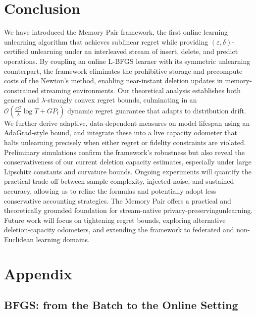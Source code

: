 \documentclass{article}
\theoremstyle{ssltheorem}
\begin{document}
\section{Conclusion}

We have introduced the Memory Pair framework, the first online learning–unlearning algorithm that achieves sublinear regret while providing $(\varepsilon, \delta)$-certified unlearning under an interleaved stream of insert, delete, and predict operations.
By coupling an online L-BFGS learner with its symmetric unlearning counterpart, the framework eliminates the prohibitive storage and precompute costs of the Newton's method, enabling near-instant deletion updates in memory-constrained streaming environments.
Our theoretical analysis establishes both general and $\lambda$-strongly convex regret bounds, culminating in an $\mathcal{O}(\tfrac{G^{2}}{\lambda}\log T + G P_{t})$ dynamic regret guarantee that adapts to distribution drift.
We further derive adaptive, data-dependent measures on model lifespan using an AdaGrad-style bound, and integrate these into a live capacity odometer that halts unlearning precisely when either regret or fidelity constraints are violated.
Preliminary simulations confirm the framework’s robustness but also reveal the conservativeness of our current deletion capacity estimates, especially under large Lipschitz constants and curvature bounds.
Ongoing experiments will quantify the practical trade-off between sample complexity, injected noise, and sustained accuracy, allowing us to refine the formulas and potentially adopt less conservative accounting strategies.
The Memory Pair offers a practical and theoretically grounded foundation for stream-native privacy-preservingunlearning.
Future work will focus on tightening regret bounds, exploring alternative deletion-capacity odometers, and extending the framework to federated and non-Euclidean learning domains.
\section{Appendix}

\subsection{BFGS: from the Batch to the Online Setting}
\end{document}
